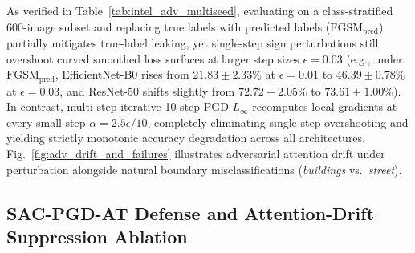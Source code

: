 \documentclass[final,5p,times,twocolumn]{elsarticle}
\begin{document}
As verified in Table~\ref{tab:intel_adv_multiseed}, evaluating on a class-stratified 600-image subset and replacing true labels with predicted labels ($\text{FGSM}_{\text{pred}}$) partially mitigates true-label leaking, yet single-step sign perturbations still overshoot curved smoothed loss surfaces at larger step sizes $\epsilon=0.03$ (e.g., under $\text{FGSM}_{\text{pred}}$, EfficientNet-B0 rises from $21.83 \pm 2.33\%$ at $\epsilon=0.01$ to $46.39 \pm 0.78\%$ at $\epsilon=0.03$, and ResNet-50 shifts slightly from $72.72 \pm 2.05\%$ to $73.61 \pm 1.00\%$). In contrast, multi-step iterative 10-step $\text{PGD-}L_\infty$ recomputes local gradients at every small step $\alpha = 2.5\epsilon/10$, completely eliminating single-step overshooting and yielding strictly monotonic accuracy degradation across all architectures. Fig.~\ref{fig:adv_drift_and_failures} illustrates adversarial attention drift under perturbation alongside natural boundary misclassifications (\emph{buildings} vs.\ \emph{street}).

\subsection{SAC-PGD-AT Defense and Attention-Drift Suppression Ablation}
\end{document}
